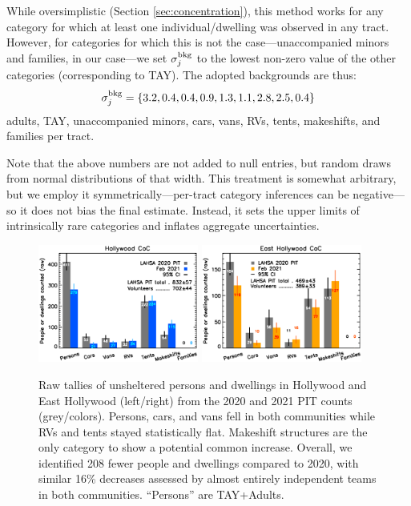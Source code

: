 \documentclass[11pt,twocolumn]{article}
\begin{document}
While oversimplistic (Section \ref{sec:concentration}), this method works for any category
for which at least one individual/dwelling was observed in any tract. However, for categories for 
which this is not the case---unaccompanied minors and families, in our case---we set 
$\sigma_{j}^{\rm bkg}$ to the lowest non-zero value of the other categories (corresponding to 
TAY). The adopted backgrounds are thus: 
\begin{equation}
	\sigma_{j}^{\rm bkg}=\{3.2, 0.4, 0.4, 0.9, 1.3, 1.1, 2.8, 2.5, 0.4\}
\end{equation}
adults, TAY, unaccompanied minors, cars, vans, RVs, tents, makeshifts, and families per tract. 

Note that the above numbers are not added to null entries, but random draws from normal distributions
of that width. This treatment is somewhat arbitrary, but we employ it symmetrically---per-tract category 
inferences can be negative---so it does not bias the final estimate. Instead, it sets the upper limits of 
intrinsically rare categories and inflates aggregate uncertainties.

\begin{figure}[t]
	\centering
	\includegraphics[width = 0.47\textwidth, trim = 1cm 0cm 0cm 0cm]{Hwood2021Bars}
	\includegraphics[width = 0.47\textwidth, trim = 0cm 0cm 1cm 0cm]{Eho2021Bars}
	\caption{Raw tallies of unsheltered persons and dwellings in Hollywood and East Hollywood
			(left/right) from the 2020 and 2021 PIT counts (grey/colors). Persons, cars, 
			and vans fell in both communities while RVs and tents stayed statistically flat. 
			Makeshift structures are the only category to show a potential common increase. 
			Overall, we identified 208 fewer people and dwellings compared to 2020,
			with similar 16\% decreases assessed by almost entirely independent teams
			in both communities. ``Persons'' are TAY+Adults.}
	\label{fig:rawCounts}
\end{figure}
\end{document}

